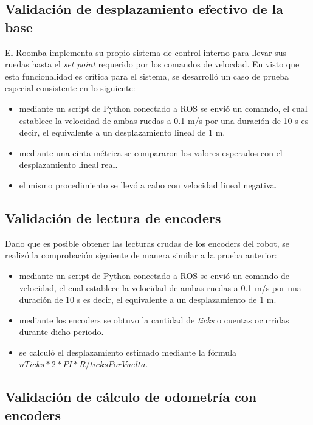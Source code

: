\subsection{Validación de desplazamiento efectivo de la base}

El Roomba implementa su propio sistema de control interno para llevar sus ruedas hasta el \textit{set point} requerido por los comandos de velocdad. En visto que esta funcionalidad es crítica para el sistema, se desarrolló un caso de prueba especial consistente en lo siguiente:

\begin{itemize}
    \item mediante un script de Python conectado a ROS se envió un comando, el cual establece la velocidad de ambas ruedas a 0.1 m/s por una duración de 10 s es decir, el equivalente a un desplazamiento lineal de 1 m.
    \item mediante una cinta métrica se compararon los valores esperados con el desplazamiento lineal real.
    \item el mismo procedimiento se llevó a cabo con velocidad lineal negativa.
\end{itemize}

\subsection{Validación de lectura de encoders}

Dado que es posible obtener las lecturas crudas de los encoders del robot, se realizó la comprobación siguiente de manera similar a la prueba anterior:

\begin{itemize}
    \item mediante un script de Python conectado a ROS se envió un comando de velocidad, el cual establece la velocidad de ambas ruedas a 0.1 m/s por una duración de 10 s es decir, el equivalente a un desplazamiento de 1 m.
    \item mediante los encoders se obtuvo la cantidad de \textit{ticks} o cuentas ocurridas durante dicho periodo.
    \item se calculó el desplazamiento estimado mediante la fórmula $nTicks * 2 * PI * R / ticksPorVuelta$.
\end{itemize}

\subsection{Validación de cálculo de odometría con encoders}

